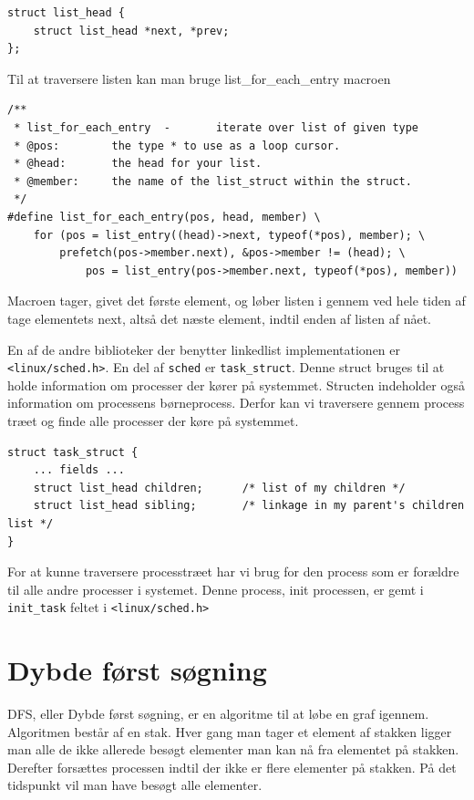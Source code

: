 \documentclass[danish]{report}
\begin{document}
\begin{lstlisting}
struct list_head {
    struct list_head *next, *prev;
};
\end{lstlisting}

Til at traversere listen kan man bruge list\_for\_each\_entry macroen

\begin{lstlisting}
/**
 * list_for_each_entry  -       iterate over list of given type
 * @pos:        the type * to use as a loop cursor.
 * @head:       the head for your list.
 * @member:     the name of the list_struct within the struct.
 */
#define list_for_each_entry(pos, head, member) \
    for (pos = list_entry((head)->next, typeof(*pos), member); \
        prefetch(pos->member.next), &pos->member != (head); \
            pos = list_entry(pos->member.next, typeof(*pos), member))
\end{lstlisting}

Macroen tager, givet det første element, og løber listen i gennem ved hele tiden af tage elementets next, altså det næste element, indtil enden af listen af nået.

En af de andre biblioteker der benytter linkedlist implementationen er \texttt{<linux/sched.h>}. En del af \texttt{sched} er \texttt{task\_struct}. Denne struct bruges til at holde information om processer der kører på systemmet. Structen indeholder også information om processens børneprocess. Derfor kan vi traversere gennem process træet og finde alle processer der køre på systemmet.

\begin{lstlisting}
struct task_struct {
    ... fields ...
    struct list_head children;      /* list of my children */
    struct list_head sibling;       /* linkage in my parent's children list */
}
\end{lstlisting}

For at kunne traversere processtræet har vi brug for den process som er forældre til alle andre processer i systemet. Denne process, init processen, er gemt i \texttt{init\_task} feltet i \texttt{<linux/sched.h>}

\section{Dybde først søgning}
DFS, eller Dybde først søgning, er en algoritme til at løbe en graf igennem. Algoritmen består af en stak. Hver gang man tager et element af stakken ligger man alle de ikke allerede besøgt elementer man kan nå fra elementet på stakken. Derefter forsættes processen indtil der ikke er flere elementer på stakken. På det tidspunkt vil man have besøgt alle elementer.
\end{document}
